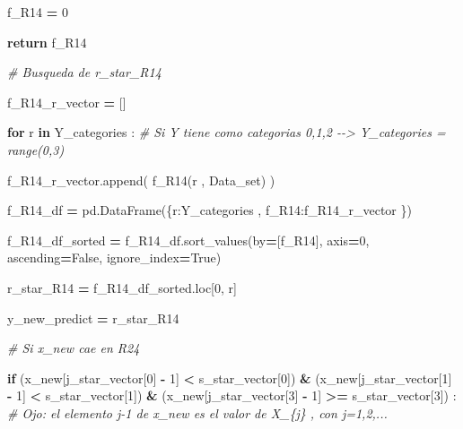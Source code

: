 \documentclass[
  11pt,
  a4paper,
]{article}
\newenvironment{Shaded}{\begin{snugshade}}{\end{snugshade}}
\newcommand{\CommentTok}[1]{\textcolor[rgb]{0.56,0.35,0.01}{\textit{#1}}}
\newcommand{\ControlFlowTok}[1]{\textcolor[rgb]{0.13,0.29,0.53}{\textbf{#1}}}
\newcommand{\DecValTok}[1]{\textcolor[rgb]{0.00,0.00,0.81}{#1}}
\newcommand{\KeywordTok}[1]{\textcolor[rgb]{0.13,0.29,0.53}{\textbf{#1}}}
\newcommand{\NormalTok}[1]{#1}
\newcommand{\OperatorTok}[1]{\textcolor[rgb]{0.81,0.36,0.00}{\textbf{#1}}}
\newcommand{\StringTok}[1]{\textcolor[rgb]{0.31,0.60,0.02}{#1}}
\newcommand{\VariableTok}[1]{\textcolor[rgb]{0.00,0.00,0.00}{#1}}
\begin{document}
\begin{Shaded}
\begin{Highlighting}[]
\NormalTok{                            f\_R14 }\OperatorTok{=} \DecValTok{0}

                        \ControlFlowTok{return}\NormalTok{ f\_R14}

                
            \CommentTok{\# Busqueda de r\_star\_R14}

\NormalTok{                f\_R14\_r\_vector }\OperatorTok{=}\NormalTok{ []}

                \ControlFlowTok{for}\NormalTok{ r }\KeywordTok{in}\NormalTok{ Y\_categories :  }\CommentTok{\# Si Y tiene como categorias 0,1,2 {-}{-}\textgreater{} Y\_categories = range(0,3)}

\NormalTok{                    f\_R14\_r\_vector.append( f\_R14(r , Data\_set) )}

\NormalTok{                f\_R14\_df }\OperatorTok{=}\NormalTok{ pd.DataFrame(\{}\StringTok{\textquotesingle{}r\textquotesingle{}}\NormalTok{:Y\_categories  , }\StringTok{\textquotesingle{}f\_R14\textquotesingle{}}\NormalTok{:f\_R14\_r\_vector \})}
        
\NormalTok{                f\_R14\_df\_sorted }\OperatorTok{=}\NormalTok{ f\_R14\_df.sort\_values(by}\OperatorTok{=}\NormalTok{[}\StringTok{\textquotesingle{}f\_R14\textquotesingle{}}\NormalTok{], axis}\OperatorTok{=}\DecValTok{0}\NormalTok{, ascending}\OperatorTok{=}\VariableTok{False}\NormalTok{, ignore\_index}\OperatorTok{=}\VariableTok{True}\NormalTok{)}

\NormalTok{                r\_star\_R14 }\OperatorTok{=}\NormalTok{ f\_R14\_df\_sorted.loc[}\DecValTok{0}\NormalTok{, }\StringTok{\textquotesingle{}r\textquotesingle{}}\NormalTok{]}


\NormalTok{                y\_new\_predict }\OperatorTok{=}\NormalTok{ r\_star\_R14}




            \CommentTok{\# Si x\_new cae en R24}


            \ControlFlowTok{if}\NormalTok{ (x\_new[j\_star\_vector[}\DecValTok{0}\NormalTok{] }\OperatorTok{{-}} \DecValTok{1}\NormalTok{] }\OperatorTok{\textless{}}\NormalTok{ s\_star\_vector[}\DecValTok{0}\NormalTok{]) }\OperatorTok{\&}\NormalTok{ (x\_new[j\_star\_vector[}\DecValTok{1}\NormalTok{] }\OperatorTok{{-}} \DecValTok{1}\NormalTok{] }\OperatorTok{\textless{}}\NormalTok{ s\_star\_vector[}\DecValTok{1}\NormalTok{]) }\OperatorTok{\&}\NormalTok{ (x\_new[j\_star\_vector[}\DecValTok{3}\NormalTok{] }\OperatorTok{{-}} \DecValTok{1}\NormalTok{] }\OperatorTok{\textgreater{}=}\NormalTok{ s\_star\_vector[}\DecValTok{3}\NormalTok{]) :  }\CommentTok{\# Ojo: el elemento j{-}1 de x\_new es el valor de X\_\{j\} , con j=1,2,...}


\end{Highlighting}
\end{Shaded}
\end{document}
